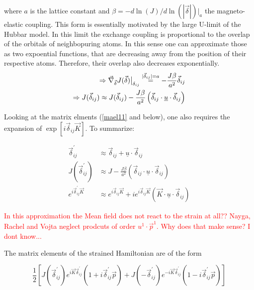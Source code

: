 \documentclass[../../../main.tex]{subfiles}
\begin{document}
where $a$ is the lattice constant and $\beta = -d\ln(J)/d\ln(|\vec{\delta}|)\big\rvert_{a}$ the magneto-elastic coupling. This form is essentially motivated by the large U-limit of the Hubbar model. In this limit the exchange coupling is proportional to the overlap of the orbitals of neighbopuring atoms. In this sense one can approximate those as two expoential functions, that are decreasing away from the position of their respective atoms. Therefore, their overlap also decreases exponentially. \\

\begin{align}
	\Rightarrow \vec{\nabla}_{\vec{\delta}}J(\vec{\delta})\big\rvert_{\delta_{ij}} \overset{|\vec{\delta}_{ij}| = a}{=} -\frac{J\beta}{a^2} \vec{\delta}_{ij} \notag  \\
	\Rightarrow J(\vec{\delta}_{ij}) \approx J(\vec{\delta}_{ij}) - \frac{J\beta}{a^2}\left( \vec{\delta}_{ij} \cdot \underline{u} \cdot \vec{\delta}_{ij} \right)
\end{align}

Looking at the matrix elments (\ref{mael11} and below), one also requires the expansion of $\exp[i\vec{\delta}_{ij}\vec{K}]$. To summarize:

\begin{align}
	\vec{\delta}_{ij}^\prime &\approx \vec{\delta}_{ij} + \underline{u} \cdot \vec{\delta}_{ij} \\
	J(\vec{\delta}_{ij}^\prime) &\approx J - \frac{J\beta}{a^2}\left( \vec{\delta}_{ij} \cdot \underline{u} \cdot \vec{\delta}_{ij}\right) \\
	e^{i\vec{\delta}_{ij}^\prime\vec{K}} &\approx e^{i\vec{\delta}_{ij}\vec{K}} + ie^{i\vec{\delta}_{ij}\vec{K}}\left( \vec{K} \cdot \underline{u} \cdot \vec{\delta}_{ij}
	\right)
\end{align}


\textcolor{red}{In this approximation the Mean field does not react to the strain at all??}
\textcolor{red}{Nayga, Rachel and Vojta neglect prodcuts of order $u^{1}\cdot\vec{p}^{1}$. Why does that make sense? I dont know...}

The matrix elements of the strained Hamiltonian are of the form 

\begin{equation}
	\frac12\left[J(\vec{\delta}_{ij}^\prime)e^{i\vec{K}\vec{\delta}_{ij}^\prime}(1+i\vec{\delta}_{ij}^\prime\vec{p}) + J(-\vec{\delta}_{ij}^\prime)e^{-i\vec{K}\vec{\delta}_{ij}^\prime}(1-i\vec{\delta}_{ij}^\prime\vec{p})\right]
\end{equation}
\end{document}
